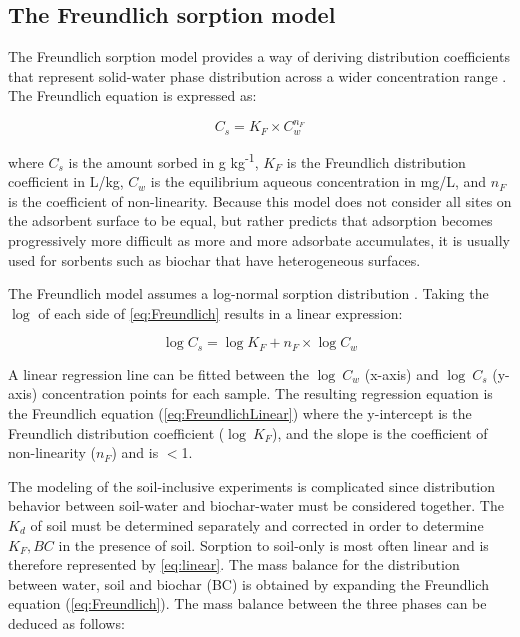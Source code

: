 \subsection{The Freundlich sorption model \label{sec:soilattenuation}}
The Freundlich sorption model provides a way of deriving distribution coefficients that represent solid-water phase distribution across a wider concentration range \citep{zhang2013sorption}. The Freundlich equation is expressed as:

\begin{equation} \label{eq:Freundlich}
    C_s = K_F \times C_{w}^{n_F}
\end{equation}

where $C_s$ is the amount sorbed in \textmu g kg\textsuperscript{-1}, $K_F$ is the Freundlich distribution coefficient in L/kg, $C_{w}$ is the equilibrium aqueous concentration in mg/L, and $n_F$ is the coefficient of non-linearity. Because this model does not consider all sites on the adsorbent surface to be equal, but rather predicts that adsorption becomes progressively more difficult as more and more adsorbate accumulates, it is usually used for sorbents such as biochar that have heterogeneous surfaces\citep{yin2022insights,schwarzenbach2005environmental}. 

The Freundlich model assumes a log-normal sorption distribution \citep{schwarzenbach2005environmental}. Taking the $\log$ of each side of \cref{eq:Freundlich} results in a linear expression:

\begin{equation} \label{eq:FreundlichLinear}
    \log C_s = \log K_F + n_F \times \log C_{w}
\end{equation}

A linear regression line can be fitted between the $\log~C_w$ (x-axis) and $\log~C_s$ (y-axis) concentration points for each sample. The resulting regression equation is the Freundlich equation (\cref{eq:FreundlichLinear}) where the y-intercept is the Freundlich distribution coefficient ($\log~K_F$), and the slope is the coefficient of non-linearity ($n_F$) and is $<$1. 

The modeling of the soil-inclusive experiments is complicated since distribution behavior between soil-water and biochar-water must be considered together. The $K_d$ of soil must be determined separately and corrected in order to determine $K_F,BC$ in the presence of soil. Sorption to soil-only is most often linear and is therefore represented by \cref{eq:linear}. The mass balance for the distribution between water, soil and biochar (BC) is obtained by expanding the Freundlich equation (\cref{eq:Freundlich}). The mass balance between the three phases can be deduced as follows:

